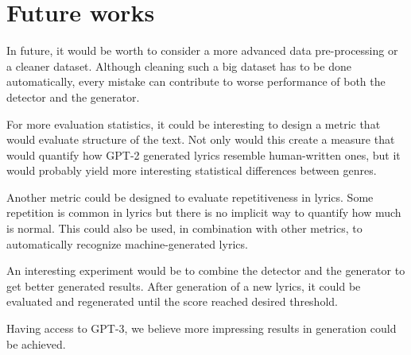\section{Future works}
In future, it would be worth to consider a more advanced data pre-processing or a cleaner dataset. Although cleaning such a big dataset has to be done automatically, every mistake can contribute to worse performance of both the detector and the generator.

For more evaluation statistics, it could be interesting to design a metric that would evaluate structure of the text. Not only would this create a measure that would quantify how GPT-2 generated lyrics resemble human-written ones, but it would probably yield more interesting statistical differences between genres.

Another metric could be designed to evaluate repetitiveness in lyrics. Some repetition is common in lyrics but there is no implicit way to quantify how much is normal. This could also be used, in combination with other metrics, to automatically recognize machine-generated lyrics.

An interesting experiment would be to combine the detector and the generator to get better generated results. After generation of a new lyrics, it could be evaluated and regenerated until the score reached desired threshold.

Having access to GPT-3, we believe more impressing results in generation could be achieved.